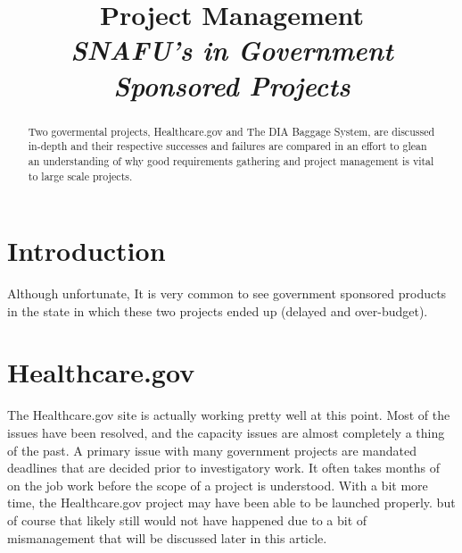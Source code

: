\documentclass[conference]{IEEEtran}
\title{Project Management\\\em\large{SNAFU's in Government Sponsored Projects}}
\author{\IEEEauthorblockN{Daniel Fallon, Student}
	\IEEEauthorblockA{Department of Computer Science,\\ College of Science, \\Illinois Institute of Technology, \\Chicago IL 60616}}
\begin{document}
\maketitle

\begin{abstract}
Two govermental projects, Healthcare.gov and The DIA Baggage System, are discussed in-depth and their respective successes and failures are compared in an effort to glean an understanding of why good requirements gathering and project management is vital to large scale projects.
\end{abstract}

\section{Introduction}
	Although unfortunate, It is very common to see government sponsored products in the state in which these two projects ended up (delayed and over-budget). 
\section{Healthcare.gov}
	The Healthcare.gov site is actually working pretty well at this point. Most of the issues have been resolved, and the capacity issues are almost completely a thing of the past. A primary issue with many government projects are mandated deadlines that are decided prior to investigatory work. It often takes months of on the job work before the scope of a project is understood. With a bit more time, the Healthcare.gov project may have been able to be launched properly. but of course that likely still would not have happened due to a bit of mismanagement that will be discussed later in this article.
\end{document}
